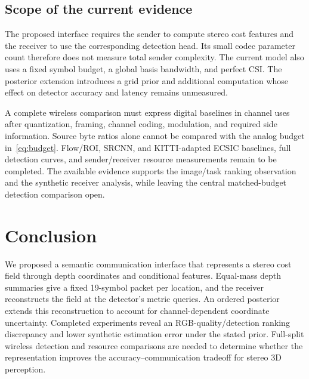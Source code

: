\documentclass[conference]{IEEEtran}
\begin{document}
\subsection{Scope of the current evidence}
The proposed interface requires the sender to compute stereo cost features
and the receiver to use the corresponding detection head. Its small codec
parameter count therefore does not measure total sender complexity. The
current model also uses a fixed symbol budget, a global basis bandwidth,
and perfect CSI. The posterior extension introduces a grid prior and
additional computation whose effect on detector accuracy and latency
remains unmeasured.

A complete wireless comparison must express digital baselines in channel
uses after quantization, framing, channel coding, modulation, and required
side information. Source byte ratios alone cannot be compared with the
analog budget in~\eqref{eq:budget}. Flow/ROI, SRCNN, and KITTI-adapted ECSIC
baselines, full detection curves, and sender/receiver resource measurements
remain to be completed. The available evidence supports the image/task
ranking observation and the synthetic receiver analysis, while leaving
the central matched-budget detection comparison open.

\section{Conclusion}
We proposed a semantic communication interface that represents a stereo
cost field through depth coordinates and conditional features. Equal-mass
depth summaries give a fixed 19-symbol packet per location, and the
receiver reconstructs the field at the detector's metric queries. An
ordered posterior extends this reconstruction to account for channel-dependent
coordinate uncertainty. Completed experiments reveal an RGB-quality/detection
ranking discrepancy and lower synthetic estimation error under the stated
prior. Full-split wireless detection and resource comparisons are needed
to determine whether the representation improves the accuracy--communication
tradeoff for stereo 3D perception.
\end{document}
